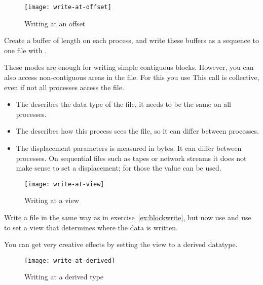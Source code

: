 \begin{figure}[ht]
  \label{fig:write-at}
  \caption{Writing at an offset}
  \texttt{[image: write-at-offset]}
\end{figure}

\begin{exercise}
  \label{ex:blockwrite}
  Create a buffer of length  on each process, and write
  these buffers as a sequence to one file with .
\end{exercise}

These modes are enough for writing simple contiguous blocks. However,
you can also access non-contiguous areas in the file. For this you use
%
%
This call is collective, even if not all processes access the file.
\begin{itemize}
\item The  describes the data type of the file, it needs to
  be the same on all processes.
\item The  describes how this process sees the file, so it
  can differ between processes.
\item The  displacement parameters is measured in bytes. It
  can differ between processes. On sequential files such as tapes or
  network streams it does not make sense to set a displacement; for
  those the  value can be
  used.
\end{itemize}

\begin{figure}[ht]
  \label{fig:write-view}
  \caption{Writing at a view}
  \texttt{[image: write-at-view]}
\end{figure}


\begin{exercise}
  \label{ex:viewwrite}
  Write a file in the same way as in exercise~\ref{ex:blockwrite},
  but now use  and use  to set
  a view that determines where the data is written.
\end{exercise}

You can get very creative effects by setting the view to a derived
datatype.

\begin{figure}[ht]
  \label{fig:write-derived}
  \caption{Writing at a derived type}
  \texttt{[image: write-at-derived]}
\end{figure}

